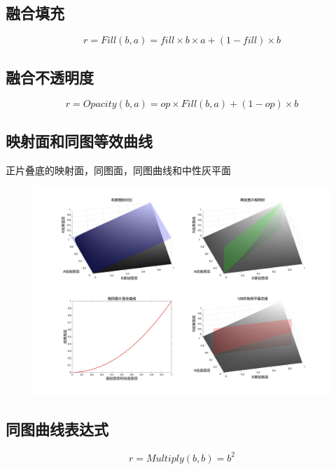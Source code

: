 \subsection{ 融合填充}


\begin{equation}r= Fill(b,a) =fill\times b\times a+(1-fill)\times b\end{equation}

\subsection{ 融合不透明度}


\begin{equation}r=Opacity(b,a)=op\times Fill(b,a)+(1-op)\times b\end{equation}

\subsection{ 映射面和同图等效曲线}

正片叠底的映射面，同图面，同图曲线和中性灰平面
\begin{figure}[!htb]
	\centering
	\includegraphics[width=\linewidth]{figure/正片叠底.jpg}
	\caption{}
	\label{fig:}
\end{figure}


\subsection{ 同图曲线表达式}


\begin{equation}r=Multiply(b,b)= b^2\end{equation}

